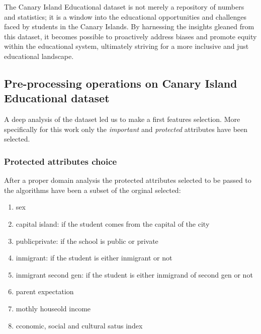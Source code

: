 \documentclass[12pt,a4paper,openright,twoside]{book}
\begin{document}
The Canary Island Educational dataset is not merely a repository of numbers and statistics; it is a window into the educational opportunities and challenges faced by students in the Canary Islands. By harnessing the insights gleaned from this dataset, it becomes possible to proactively address biases and promote equity within the educational system, ultimately striving for a more inclusive and just educational landscape.

\subsection{Pre-processing operations on Canary Island Educational dataset}

A deep analysis of the dataset led us to make a first features selection. More specifically for this work only the \emph{important} and \emph{protected} attributes have been selected.

\subsubsection{Protected attributes choice}

After a proper domain analysis the protected attributes selected to be passed to the algorithms have been a subset of the orginal selected:

\begin{enumerate}

    \item sex

    \item capital island: if the student comes from the capital of the city

    \item public\textunderscore private: if the school is public or private

    \item inmigrant: if the student is either inmigrant or not

    \item inmigrant second gen: if the student is either inmigrand of second gen or not

    \item parent expectation
    
    \item mothly houseold income

    \item cconomic, social and cultural satus index

\end{enumerate}
\end{document}
